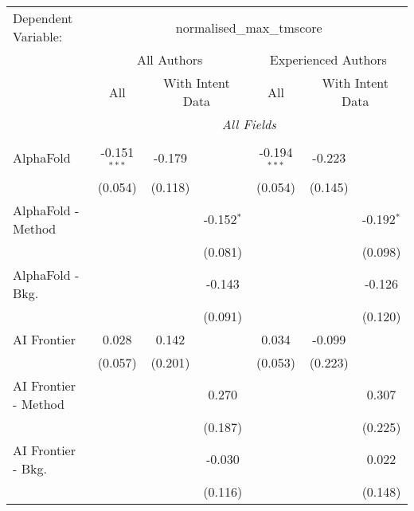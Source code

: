 \begingroup
\centering
\begin{tabular}{lcccccc}
   \tabularnewline \midrule \midrule
   Dependent Variable: & \multicolumn{6}{c}{normalised\_max\_tmscore}\\
 & \multicolumn{3}{c}{All Authors} & \multicolumn{3}{c}{Experienced Authors} \\
\cmidrule(lr){2-4} \cmidrule(lr){5-7}
 & \multicolumn{1}{c}{All} & \multicolumn{2}{c}{With Intent Data} & \multicolumn{1}{c}{All} & \multicolumn{2}{c}{With Intent Data} \\
\cmidrule(lr){2-2} \cmidrule(lr){3-4} \cmidrule(lr){5-5} \cmidrule(lr){6-7}
 & \multicolumn{6}{c}{\textit{All Fields}} \\ \\
   AlphaFold            & -0.151$^{***}$ & -0.179  &              & -0.194$^{***}$ & -0.223        &   \\   
                        & (0.054)        & (0.118) &              & (0.054)        & (0.145)       &   \\   
   AlphaFold - Method   &                &         & -0.152$^{*}$ &                &               & -0.192$^{*}$\\   
                        &                &         & (0.081)      &                &               & (0.098)\\   
   AlphaFold - Bkg.     &                &         & -0.143       &                &               & -0.126\\   
                        &                &         & (0.091)      &                &               & (0.120)\\   
   AI Frontier          & 0.028          & 0.142   &              & 0.034          & -0.099        &   \\   
                        & (0.057)        & (0.201) &              & (0.053)        & (0.223)       &   \\   
   AI Frontier - Method &                &         & 0.270        &                &               & 0.307\\   
                        &                &         & (0.187)      &                &               & (0.225)\\   
   AI Frontier - Bkg.   &                &         & -0.030       &                &               & 0.022\\   
                        &                &         & (0.116)      &                &               & (0.148)\\   

\end{tabular}
